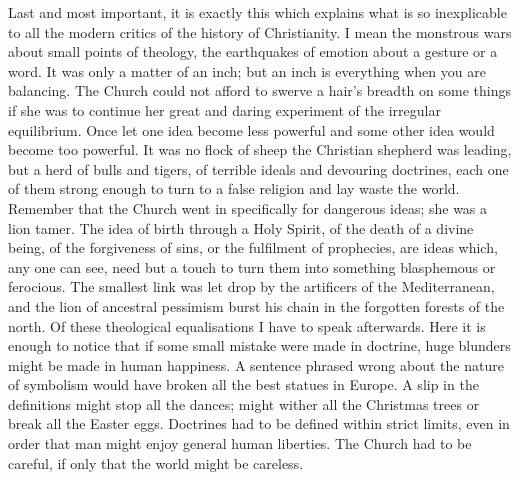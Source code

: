 Last and most important, it is exactly this which explains what is so inexplicable to all the modern critics of the history of Christianity. I mean the monstrous wars about small points of theology, the earthquakes of emotion about a gesture or a word. It was only a matter of an inch; but an inch is everything when you are balancing. The Church could not afford to swerve a hair’s breadth on some things if she was to continue her great and daring experiment of the irregular equilibrium. Once let one idea become less powerful and some other idea would become too powerful. It was no flock of sheep the Christian shepherd was leading, but a herd of bulls and tigers, of terrible ideals and devouring doctrines, each one of them strong enough to turn to a false religion and lay waste the world. Remember that the Church went in specifically for dangerous ideas; she was a lion tamer. The idea of birth through a Holy Spirit, of the death of a divine being, of the forgiveness of sins, or the fulfilment of prophecies, are ideas which, any one can see, need but a touch to turn them into something blasphemous or ferocious. The smallest link was let drop by the artificers of the Mediterranean, and the lion of ancestral pessimism burst his chain in the forgotten forests of the north. Of these theological equalisations I have to speak afterwards. Here it is enough to notice that if some small mistake were made in doctrine, huge blunders might be made in human happiness. A sentence phrased wrong about the nature of symbolism would have broken all the best statues in Europe. A slip in the definitions might stop all the dances; might wither all the Christmas trees or break all the Easter eggs. Doctrines had to be defined within strict limits, even in order that man might enjoy general human liberties. The Church had to be careful, if only that the world might be careless.


